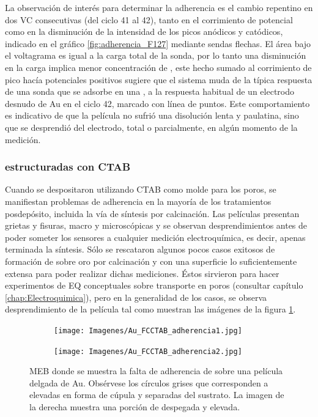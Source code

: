 			 La observación de interés para determinar la adherencia es el cambio repentino en dos VC consecutivas (del ciclo 41 al 42), tanto en el corrimiento de potencial como en la disminución de la intensidad de los picos anódicos y catódicos, indicado en el gráfico \ref{fig:adherencia_F127} mediante sendas flechas. El área bajo el voltagrama es igual a la carga total de la sonda, por lo tanto una disminución en la carga implica menor concentración de \aminorutenio, este hecho sumado al corrimiento de pico hacía potenciales positivos sugiere que el sistema muda de la típica respuesta de una sonda que se adsorbe en una \pdm, a la respuesta habitual de un electrodo desnudo de Au en el ciclo 42, marcado con línea de puntos. Este comportamiento es indicativo de que la película no sufrió una disolución lenta y paulatina, sino que se desprendió del electrodo, total o parcialmente, en algún momento de la medición.	     		

		\subsubsection{\pdm\space estructuradas con CTAB}	     		
				     		
			Cuando se despositaron \pdm\space utilizando CTAB como molde para los poros, se manifiestan problemas de adherencia en la mayoría de los tratamientos posdepósito, incluida la vía de síntesis por calcinación. Las películas presentan grietas y fisuras, macro y microscópicas y se observan desprendimientos antes de poder someter los sensores a cualquier medición electroquímica, es decir, apenas terminada la síntesis. Sólo se rescataron algunos pocos casos exitosos de formación de \pdmC\space sobre oro por calcinación y con una superficie lo suficientemente extensa para poder realizar dichas mediciones. Éstos sirvieron para hacer experimentos de EQ conceptuales sobre transporte en poros (consultar capítulo \ref{chap:Electroquimica}), pero en la generalidad de los casos, se observa desprendimiento de la película tal como muestran las imágenes de la figura \ref{fig:CTAB_adherencia}.

	     
				\begin{figure}[b!]
		 	   	    \begin{subfigure}[t]{0.49\textwidth}
			        	\texttt{[image: Imagenes/Au\_FCCTAB\_adherencia1.jpg]}
			       		\end{subfigure}
					\begin{subfigure}[t]{0.49\textwidth}
			 	   	    \texttt{[image: Imagenes/Au\_FCCTAB\_adherencia2.jpg]}
			       		\end{subfigure}
					 \caption[Adherencia de CTAB sobre electrodos.]{MEB donde se muestra la falta de adherencia de \pdmC\space sobre una película delgada de Au. Obsérvese los círculos grises que corresponden a \pdm\space elevadas en forma de cúpula y separadas del sustrato. La imagen de la derecha muestra una porción de \pdmC\space despegada y elevada.}
					 \label{fig:CTAB_adherencia}	
				     \end{figure}
			
